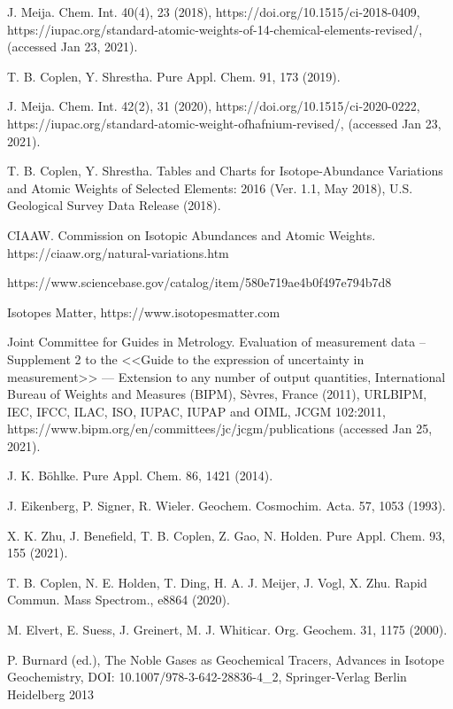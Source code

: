 \documentclass[a5paper,openany]{book}
\begin{document}
\begin{thebibliography}{00}
 J. Meija. Chem. Int. 40(4), 23 (2018), https://doi.org/10.1515/ci-2018-0409, https://iupac.org/standard-atomic-weights-of-14-chemical-elements-revised/, (accessed Jan 23, 2021).

  T. B. Coplen, Y. Shrestha. Pure Appl. Chem. 91, 173 (2019).

 J. Meija. Chem. Int. 42(2), 31 (2020), https://doi.org/10.1515/ci-2020-0222, https://iupac.org/standard-atomic-weight-ofhafnium-revised/, (accessed Jan 23, 2021).

  T. B. Coplen, Y. Shrestha. Tables and Charts for Isotope-Abundance Variations and Atomic Weights of Selected Elements: 2016
(Ver. 1.1, May 2018), U.S. Geological Survey Data Release (2018).

 CIAAW. Commission on Isotopic Abundances and Atomic Weights. https://ciaaw.org/natural-variations.htm

https://www.sciencebase.gov/catalog/item/580e719ae4b0f497e794b7d8

  Isotopes Matter, https://www.isotopesmatter.com

Joint Committee for Guides in Metrology. Evaluation of measurement data – Supplement 2 to the <<Guide to the expression of
uncertainty in measurement>> --- Extension to any number of output quantities, International Bureau of Weights and Measures (BIPM), S\`{e}vres, France (2011), URLBIPM, IEC, IFCC, ILAC, ISO, IUPAC, IUPAP and OIML, JCGM 102:2011, 
https://www.bipm.org/en/committees/jc/jcgm/publications (accessed Jan 25, 2021).

 J. K. Böhlke. Pure Appl. Chem. 86, 1421 (2014).

 J. Eikenberg, P. Signer, R. Wieler. Geochem. Cosmochim. Acta. 57, 1053 (1993).

 X. K. Zhu, J. Benefield, T. B. Coplen, Z. Gao, N. Holden. Pure Appl. Chem. 93, 155 (2021).

T. B. Coplen, N. E. Holden, T. Ding, H. A. J. Meijer, J. Vogl, X. Zhu. Rapid Commun. Mass Spectrom., e8864 (2020).

M. Elvert, E. Suess, J. Greinert, M. J. Whiticar. Org. Geochem. 31, 1175 (2000).

P. Burnard (ed.), The Noble Gases as Geochemical Tracers, Advances in Isotope Geochemistry,
DOI: 10.1007/978-3-642-28836-4\_2,  Springer-Verlag Berlin Heidelberg 2013


\end{thebibliography}
\end{document}
